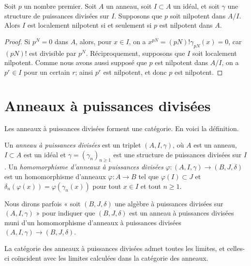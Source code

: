 \begin{lemma}
\label{lemma-nil}
Soit $p$ un nombre premier. Soit $A$ un anneau, soit $I \subset A$ un idéal,
et soit $\gamma$ une structure de puissances divisées sur $I$. Supposons que $p$ soit nilpotent
dans $A/I$. Alors $I$ est localement nilpotent si et seulement si $p$ est nilpotent dans $A$.
\end{lemma}

\begin{proof}
Si $p^N = 0$ dans $A$, alors, pour $x \in I$, on a
$x^{pN} = (pN)!\gamma_{pN}(x) = 0$, car $(pN)!$ est
divisible par $p^N$. Réciproquement, supposons que $I$ soit localement nilpotent.
Comme nous avons aussi supposé que $p$ est nilpotent dans $A/I$, on a
$p^r \in I$ pour un certain $r$; ainsi $p^r$ est nilpotent, et donc $p$ est nilpotent.
\end{proof}








\section{Anneaux à puissances divisées}
\label{section-divided-power-rings}

\noindent
Les anneaux à puissances divisées forment une
catégorie. En voici la définition.

\begin{definition}
\label{definition-divided-power-ring}
Un {\it anneau à puissances divisées} est un triplet $(A, I, \gamma)$, où
$A$ est un anneau, $I \subset A$ est un idéal et $\gamma = (\gamma_n)_{n \geq 1}$
est une structure de puissances divisées sur $I$.
Un {\it homomorphisme d'anneaux à puissances divisées}
$\varphi : (A, I, \gamma) \to (B, J, \delta)$ est un homomorphisme d'anneaux
$\varphi : A \to B$ tel que $\varphi(I) \subset J$ et
$\delta_n(\varphi(x)) = \varphi(\gamma_n(x))$ pour tout $x \in I$ et tout
$n \geq 1$.
\end{definition}

\noindent
Nous dirons parfois « soit $(B, J, \delta)$ une algèbre à puissances divisées sur
$(A, I, \gamma)$ » pour indiquer que $(B, J, \delta)$ est un anneau à
puissances divisées muni d'un homomorphisme d'anneaux à puissances divisées
$(A, I, \gamma) \to (B, J, \delta)$.

\begin{lemma}
\label{lemma-limits} La
catégorie des anneaux à puissances divisées admet toutes les limites, et celles-ci coïncident avec les
limites calculées dans la catégorie des anneaux.
\end{lemma}

